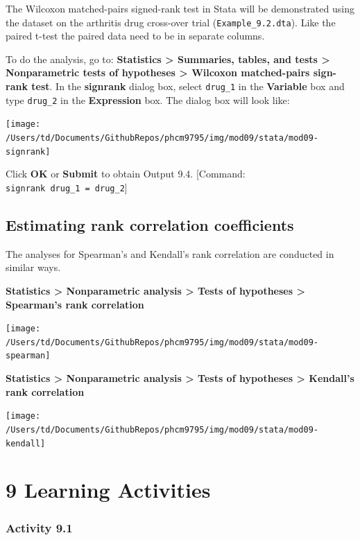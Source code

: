 \documentclass[
]{memoir}
\begin{document}
The Wilcoxon matched-pairs signed-rank test in Stata will be demonstrated using the dataset on the arthritis drug cross-over trial (\texttt{Example\_9.2.dta}). Like the paired t-test the paired data need to be in separate columns.

To do the analysis, go to: \textbf{Statistics \textgreater{} Summaries, tables, and tests \textgreater{} Nonparametric tests of hypotheses \textgreater{} Wilcoxon matched-pairs sign-rank test}. In the \textbf{signrank} dialog box, select \texttt{drug\_1} in the \textbf{Variable} box and type \texttt{drug\_2} in the \textbf{Expression} box. The dialog box will look like:

\texttt{[image: /Users/td/Documents/GithubRepos/phcm9795/img/mod09/stata/mod09-signrank]}

Click \textbf{OK} or \textbf{Submit} to obtain Output 9.4.
{[}Command: \texttt{signrank\ drug\_1\ =\ drug\_2}{]}

\hypertarget{estimating-rank-correlation-coefficients}{%
\section{Estimating rank correlation coefficients}\label{estimating-rank-correlation-coefficients}}

The analyses for Spearman's and Kendall's rank correlation are conducted in similar ways.

\textbf{Statistics \textgreater{} Nonparametric analysis \textgreater{} Tests of hypotheses \textgreater{} Spearman's rank correlation}

\texttt{[image: /Users/td/Documents/GithubRepos/phcm9795/img/mod09/stata/mod09-spearman]}

\textbf{Statistics \textgreater{} Nonparametric analysis \textgreater{} Tests of hypotheses \textgreater{} Kendall's rank correlation}

\texttt{[image: /Users/td/Documents/GithubRepos/phcm9795/img/mod09/stata/mod09-kendall]}

\hypertarget{learning-activities-8}{%
\chapter*{\texorpdfstring{\textbf{9} Learning Activities}{9 Learning Activities}}\label{learning-activities-8}}

\hypertarget{activity-9.1}{%
\subsection*{Activity 9.1}\label{activity-9.1}}
\end{document}
